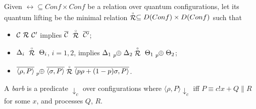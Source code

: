 \begin{definition}
	Given $\rel \subseteq Conf \times Conf$ be a relation over quantum configurations, let its quantum lifting be the minimal relation $\stackrel{\scriptscriptstyle \circ}{\mathcal{R}} \subseteq D(Conf) \times D(Conf)$ such that
	\begin{itemize}
		\item $\mathcal{C}\ \mathcal{R}\ \mathcal{C}'$ implies $\overline{\conf}\ \slift{\rel}\ \overline{\conf'}$;
		\item $\Delta_i\ \slift{\rel}\ \Theta_i$, $i = 1, 2$, implies $\Delta_1 \psum{p} \Delta_2 \slift{\rel}\ \Theta_1 \psum{p} \Theta_2$;
		\item $\overline{\confw{\rho, P}} \psum{p} \overline{\confw{\sigma, P}} \slift{\rel} \overline{\confw{p \rho + (1-p)\sigma, P}}$.
	\end{itemize} 
\end{definition}



\begin{definition}[Barb]
	A \emph{barb} is a predicate $\downarrow_{c}$ over configurations where $\langle \rho, P \rangle \downarrow_{c}$ iff $P \equiv c!x + Q \parallel R$ for some $x$, and processes $Q$, $R$.
\end{definition}



